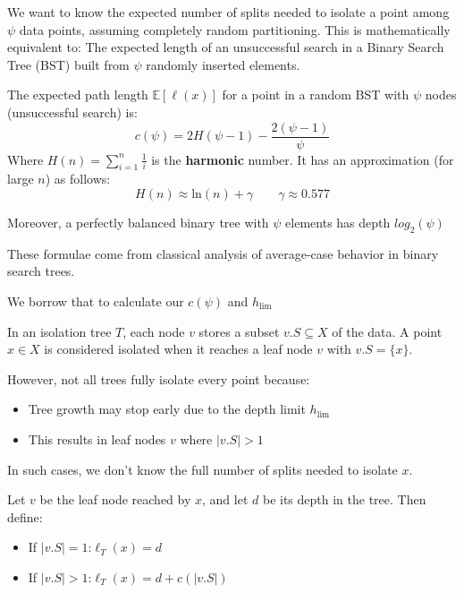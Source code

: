 \documentclass{article}
\begin{document}
We want to know the expected number of splits needed to isolate a point among $\psi$ data points, assuming completely random partitioning. This is mathematically equivalent to: The expected length of an unsuccessful search in a Binary Search Tree (BST) built from $\psi$ randomly inserted elements.

The expected path length $\mathbb{E}[\ell(x)]$ for a point in a random BST with $\psi$ nodes (unsuccessful search) is:
\[
c(\psi) = 2H(\psi - 1) - \frac{2(\psi - 1)}{\psi}
\]
Where $H(n) = \sum_{i=1}^n \frac{1}{i}$ is the \textbf{harmonic} number. It has an approximation (for large $n$) as follows:
\[
H(n) \approx \text{ln}(n) + \gamma \qquad \gamma \approx 0.577
\]

Moreover, a perfectly balanced binary tree with $\psi$ elements has depth $log_2(\psi)$

These formulae come from classical analysis of average-case behavior in binary search trees. 

We borrow that to calculate our $c(\psi)$ and $h_{\text{lim}}$



In an isolation tree \( T \), each node \( v \) stores a subset \( v.S \subseteq X \) of the data.  
A point \( x \in X \) is considered isolated when it reaches a leaf node \( v \) with \( v.S = \{x\} \).

However, not all trees fully isolate every point because:
\begin{itemize}
  \item Tree growth may stop early due to the depth limit \( h_{\text{lim}} \)
  \item This results in leaf nodes \( v \) where \( |v.S| > 1 \)
\end{itemize}

In such cases, we don't know the full number of splits needed to isolate \( x \).


Let \( v \) be the leaf node reached by \( x \), and let \( d \) be its depth in the tree.  
Then define:

\begin{itemize}
  \item If \( |v.S| = 1 \):\quad \( \ell_T(x) = d \)
  \item If \( |v.S| > 1 \):\quad \( \ell_T(x) = d + c(|v.S|) \)
\end{itemize}
\end{document}
